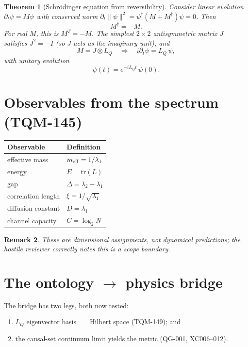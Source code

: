 \documentclass[11pt,twoside]{book}
\newtheorem{theorem}{Theorem}[chapter]
\newtheorem{remark}[theorem]{Remark}
\begin{document}
\begin{theorem}[Schr\"odinger equation from reversibility]
Consider linear evolution $\partial_t\psi = M\psi$ with conserved norm
$\partial_t\|\psi\|^2 = \psi^\dagger(M+M^\dagger)\psi = 0$. Then
\begin{equation}
M^\dagger = -M .
\end{equation}
For real $M$, this is $M^T=-M$. The simplest $2\times2$ antisymmetric matrix $J$ satisfies
$J^2=-I$ (so $J$ acts as the imaginary unit), and
\begin{equation}
M = J\otimes L_Q \quad\Longrightarrow\quad i\partial_t \psi = L_Q\,\psi,
\end{equation}
with unitary evolution
\begin{equation}
\psi(t) = e^{-iL_Qt}\,\psi(0).
\end{equation}
\end{theorem}

\section{Observables from the spectrum (TQM-145)}

\begin{center}
\begin{tabular}{ll}
\toprule
Observable & Definition \\
\midrule
effective mass & $m_{\rm eff} = 1/\lambda_1$ \\
energy & $E = \mathrm{tr}(L)$ \\
gap & $\Delta = \lambda_2-\lambda_1$ \\
correlation length & $\xi = 1/\sqrt{\lambda_1}$ \\
diffusion constant & $D = \lambda_1$ \\
channel capacity & $C = \log_2 N$ \\
\bottomrule
\end{tabular}
\end{center}

\begin{remark}
These are \emph{dimensional assignments}, not dynamical predictions; the hostile reviewer
correctly notes this is a scope boundary.
\end{remark}

\section{The ontology $\to$ physics bridge}

The bridge has two legs, both now tested:
\begin{enumerate}
\item $L_Q$ eigenvector basis $=$ Hilbert space (TQM-149); and
\item the causal-set continuum limit yields the metric (QG-001, XC006--012).
\end{enumerate}
\end{document}
